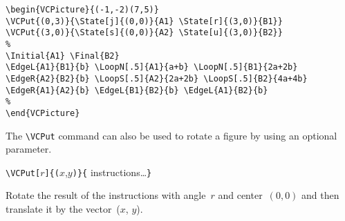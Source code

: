 \documentclass[11pt,twoside]{article}
\newlength{\ColoText}%
\newlength{\ColoFigu}%
\newlength{\parindenttemp} %
\newcommand{\noi}{\noindent}
\newlength{\jsIndent}%
\newlength{\ColSource}%
\newlength{\ColFigur}%
\begin{document}
\medskip
\noi 
\hspace*{-\jsIndent}
\begin{minipage}[c]{\ColFigur}%
\par\vspace*{0mm}%
\begin{center}
\SmallPicture{}%
\end{center}
\end{minipage}%
\hspace*{1.2em}%
\begin{minipage}[c]{\ColSource}
\setlength{\parindent}{\parindenttemp}%
\par\vspace*{0mm}%
\footnotesize
\begin{verbatim}
\begin{VCPicture}{(-1,-2)(7,5)}
\VCPut{(0,3)}{\State[j]{(0,0)}{A1} \State[r]{(3,0)}{B1}}
\VCPut{(3,0)}{\State[s]{(0,0)}{A2} \State[u]{(3,0)}{B2}}
%
\Initial{A1} \Final{B2}
\EdgeL{A1}{B1}{b} \LoopN[.5]{A1}{a+b} \LoopN[.5]{B1}{2a+2b}
\EdgeR{A2}{B2}{b} \LoopS[.5]{A2}{2a+2b} \LoopS[.5]{B2}{4a+4b}
\EdgeR{A1}{A2}{b} \EdgeL{B1}{B2}{b} \EdgeL{A1}{B2}{b}
%
\end{VCPicture}
\end{verbatim}
\normalsize
\end{minipage}%

\noi
The \verb+\VCPut+ command can also be used to rotate a figure by using
an optional parameter.


\noi 
\hspace*{-\jsIndent}
\begin{minipage}[t]{\ColoText}
        \par\vspace*{0mm}%
        \footnotesize
\verb+\VCPut[+$r$\verb+]{(+$x$,$y$\verb+)}{+ instructions\ldots \verb+}+
\normalsize
\end{minipage}%
\hspace*{1.2em}%
\begin{minipage}[t]{\ColoFigu}%
\par\vspace*{0mm}%
Rotate the result of the instructions with angle~$r$ and center~$(0,0)$
and then translate it by the vector~($x$, $y$).
\end{minipage}%
\end{document}
